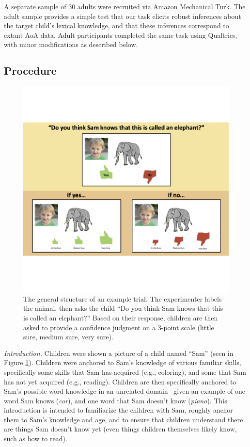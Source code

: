 \documentclass[10pt, letterpaper]{article}
\newenvironment{CodeChunk}{}{}
\begin{document}
A separate sample of 30 adults were recruited via Amazon Mechanical
Turk. The adult sample provides a simple test that our task elicits
robust inferences about the target child's lexical knowledge, and that
these inferences correspond to extant AoA data. Adult participants
completed the same task using Qualtrics, with minor modifications as
described below.

\hypertarget{procedure}{%
\subsection{Procedure}\label{procedure}}

\begin{CodeChunk}
\begin{figure}[tb]

{\centering \includegraphics{figs/task-method-1} 

}

\caption[The general structure of an example trial]{The general structure of an example trial. The experimenter labels the animal, then asks the child “Do you think Sam knows that this is called an elephant?” Based on their response, children are then asked to provide a confidence judgment on a 3-point scale (little sure, medium sure, very sure).}\label{fig:task-method}
\end{figure}
\end{CodeChunk}

\emph{Introduction.} Children were shown a picture of a child named
``Sam'' (seen in Figure \ref{fig:task-method}). Children were anchored
to Sam's knowledge of various familiar skills, specifically some skills
that Sam has acquired (e.g., coloring), and some that Sam has not yet
acquired (e.g., reading). Children are then specifically anchored to
Sam's possible word knowledge in an unrelated domain-- given an example
of one word Sam knows (\emph{car}), and one word that Sam doesn't know
(\emph{piano}). This introduction is intended to familiarize the
children with Sam, roughly anchor them to Sam's knowledge and age, and
to ensure that children understand there are things Sam doesn't know yet
(even things children themselves likely know, such as how to read).
\end{document}
